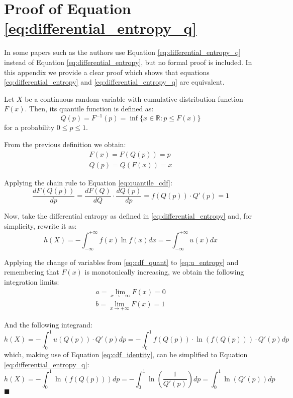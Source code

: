 \chapter{Proof of Equation \ref{eq:differential_entropy_q}}\label{entropy_proof}

In some papers such as \parencite{Vasicek} the authors use Equation \ref{eq:differential_entropy_q} instead of Equation \ref{eq:differential_entropy}, but no formal proof is included. In this appendix we provide a clear proof which shows that equations \ref{eq:differential_entropy} and \ref{eq:differential_entropy_q} are equivalent.

Let $X$ be a continuous random variable with cumulative distribution function $F(x)$. Then, its quantile function is defined as:
\begin{equation}
Q(p) = F^{-1}(p) = \inf\{x \in \mathbb{R} : p \leq F(x)\}
\end{equation}
for a probability $0 \leq p \leq 1$.

From the previous definition we obtain:
\begin{align} 
F(x) = F(Q(p)) = p \label{eq:quantile_cdf} \\ 
Q(p) = Q(F(x)) = x \label{eq:cdf_quant}
\end{align}

Applying the chain rule to Equation \ref{eq:quantile_cdf}:
\begin{equation}\label{eq:cdf_identity}
\frac{dF(Q(p))}{dp} = \frac{dF(Q)}{dQ} \cdot \frac{dQ(p)}{dp} = f(Q(p)) \cdot Q'(p) = 1
\end{equation}

Now, take the differential entropy as defined in \ref{eq:differential_entropy} and, for simplicity, rewrite it as:
\begin{equation} \label{eq:u_entropy}
h(X) = - \int_{-\infty}^{+\infty} f(x) \ln f(x) dx = - \int_{-\infty}^{+\infty} u(x) dx
\end{equation}

Applying the change of variables from \ref{eq:cdf_quant} to \ref{eq:u_entropy} and remembering that $F(x)$ is monotonically increasing, we obtain the following integration limits:
\begin{align}
a = \lim_{x \to -\infty} F(x) = 0\\
b = \lim_{x \to +\infty} F(x) = 1
\end{align}

And the following integrand:
\begin{equation}
h(X) = - \int_{0}^{1} u(Q(p)) \cdot Q'(p) dp = - \int_{0}^{1} f(Q(p)) \cdot \ln(f(Q(p))) \cdot Q'(p) dp
\end{equation}
which, making use of Equation \ref{eq:cdf_identity}, can be simplified to Equation \ref{eq:differential_entropy_q}:
\begin{equation}
h(X) = -  \int_{0}^{1} \ln\left(f(Q(p))\right) dp = - \int_{0}^{1} \ln\left(\frac{1}{Q'(p)}\right) dp = \int_{0}^{1} \ln\left(Q'(p)\right) dp
\end{equation}
\hspace*{\fill}$\blacksquare$